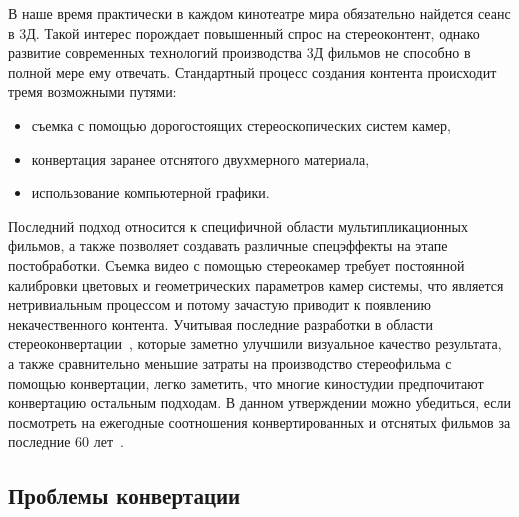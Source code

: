 \documentclass[14pt, a4paper]{extarticle}
\begin{document}
В наше время практически в каждом кинотеатре мира обязательно найдется сеанс в 3Д. 
Такой интерес порождает повышенный спрос на стереоконтент, однако развитие 
современных технологий производства 3Д фильмов не способно в полной мере ему отвечать. 
Стандартный процесс создания контента происходит тремя возможными путями: 
\begin{itemize}
	\item съемка с помощью дорогостоящих стереоскопических систем камер,
	\item конвертация заранее отснятого двухмерного материала,
	\item использование компьютерной графики.
\end{itemize}
Последний подход относится к специфичной области мультипликационных фильмов, 
а также позволяет создавать различные спецэффекты на этапе постобработки. 
Съемка видео с помощью стереокамер требует постоянной калибровки цветовых и 
геометрических параметров камер системы, что является нетривиальным процессом и 
потому зачастую приводит к появлению некачественного контента.  Учитывая последние разработки 
в области стереоконвертации~\cite{ndjiki2011depth,tolstaya2015depth}, которые 
заметно улучшили визуальное качество результата, а также сравнительно меньшие 
затраты на производство стереофильма с помощью конвертации, 
легко заметить, что многие киностудии предпочитают конвертацию остальным подходам. 
В данном утверждении можно убедиться, если посмотреть на ежегодные соотношения 
конвертированных и отснятых фильмов за последние 60 лет~\cite{realorfake}.

\subsection{Проблемы конвертации} 
\end{document}
